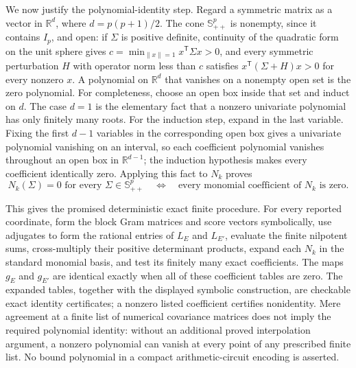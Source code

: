 We now justify the polynomial-identity step.  Regard a symmetric matrix as a vector in \(\mathbb R^d\), where \(d=p(p+1)/2\).  The cone \(\mathbb S^p_{++}\) is nonempty, since it contains \(I_p\), and open: if \(\Sigma\) is positive definite, continuity of the quadratic form on the unit sphere gives \(c=\min_{\lVert x\rVert=1}x^{\mathsf T}\Sigma x>0\), and every symmetric perturbation \(H\) with operator norm less than \(c\) satisfies \(x^{\mathsf T}(\Sigma+H)x>0\) for every nonzero \(x\).  A polynomial on \(\mathbb R^d\) that vanishes on a nonempty open set is the zero polynomial.  For completeness, choose an open box inside that set and induct on \(d\).  The case \(d=1\) is the elementary fact that a nonzero univariate polynomial has only finitely many roots.  For the induction step, expand in the last variable.  Fixing the first \(d-1\) variables in the corresponding open box gives a univariate polynomial vanishing on an interval, so each coefficient polynomial vanishes throughout an open box in \(\mathbb R^{d-1}\); the induction hypothesis makes every coefficient identically zero.  Applying this fact to \(N_k\) proves
\[
 N_k(\Sigma)=0
 \text{ for every }\Sigma\in\mathbb S^p_{++}
 \quad\Longleftrightarrow\quad
 \text{every monomial coefficient of }N_k\text{ is zero}.
\]

This gives the promised deterministic exact finite procedure.  For every reported coordinate, form the block Gram matrices and score vectors symbolically, use adjugates to form the rational entries of \(L_E\) and \(L_{E'}\), evaluate the finite nilpotent sums, cross-multiply their positive determinant products, expand each \(N_k\) in the standard monomial basis, and test its finitely many exact coefficients.  The maps \(g_E\) and \(g_{E'}\) are identical exactly when all of these coefficient tables are zero.  The expanded tables, together with the displayed symbolic construction, are checkable exact identity certificates; a nonzero listed coefficient certifies nonidentity.  Mere agreement at a finite list of numerical covariance matrices does not imply the required polynomial identity: without an additional proved interpolation argument, a nonzero polynomial can vanish at every point of any prescribed finite list.  No bound polynomial in a compact arithmetic-circuit encoding is asserted.
